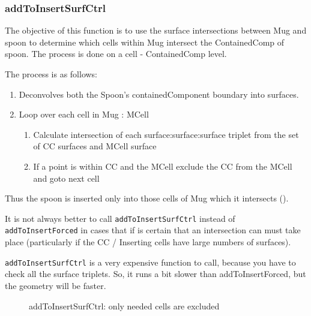 \subsubsection{addToInsertSurfCtrl}

The objective of this function is to use the surface intersections between Mug and spoon to determine which 
cells within Mug intersect the ContainedComp of spoon. The process is done on a cell - ContainedComp level. 

The process is as follows:
\begin{enumerate}

\item{Deconvolves both the Spoon's containedComponent boundary into surfaces.}
\item{Loop over each cell in Mug : MCell}
  \begin{enumerate}
  \item{Calculate intersection of each surface:surface:surface triplet from the set of CC surfaces and MCell surface}
  \item{If a point is within CC and the MCell exclude the CC from the
    MCell and goto next cell}
  \end{enumerate}
\end{enumerate}
   
Thus the spoon is inserted only into those cells of Mug which it intersects ().

It is not always better to call {\tt addToInsertSurfCtrl} instead of
{\tt addToInsertForced} in cases that if is certain that an
intersection can must take place (particularly if the CC / Inserting
cells have large numbers of surfaces).

{\tt addToInsertSurfCtrl} is a very expensive function to call,
because you have to check all the surface triplets. So, it runs a bit
slower than addToInsertForced, but the geometry will be faster.

\begin{figure}
  \centering
  \caption{addToInsertSurfCtrl: only needed cells are excluded}
  \label{fig:surfctrl}
\end{figure}

